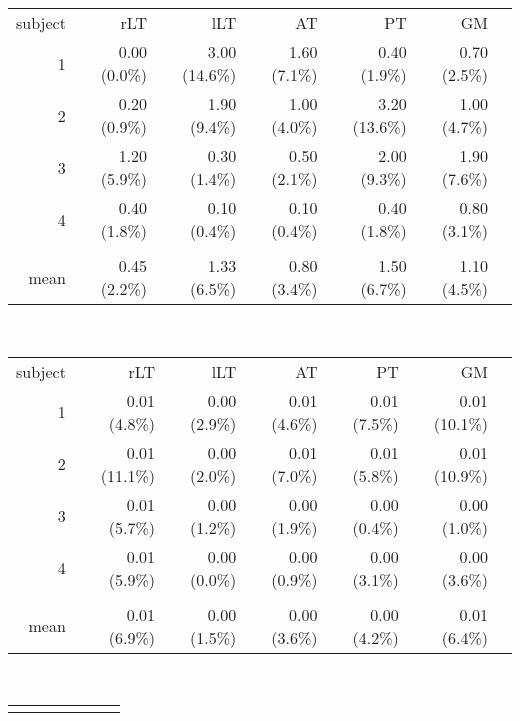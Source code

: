 \begin{table}[p]
\begin{tableframe}
\begin{adjustbox}{width={0.75\textwidth},keepaspectratio}
\begin{minipage}{\linewidth}
{\begin{minipage}{\linewidth}
\begin{tabular}{rrrrrrr}
	        \addlinespace
			\multicolumn{6}{c}{\textbf{FWHM$_{xy}$}}\\		
	        \toprule
            subject & rLT   & lLT   & AT    & PT    & GM    \\
            \midrule
            1     & 0.00 (0.0\%) & 3.00 (14.6\%) & 1.60 (7.1\%) & 0.40 (1.9\%) & 0.70 (2.5\%) \\
            2     & 0.20 (0.9\%) & 1.90 (9.4\%) & 1.00 (4.0\%) & 3.20 (13.6\%) & 1.00 (4.7\%) \\
            3     & 1.20 (5.9\%) & 0.30 (1.4\%) & 0.50 (2.1\%) & 2.00 (9.3\%) & 1.90 (7.6\%) \\
            4     & 0.40 (1.8\%) & 0.10 (0.4\%) & 0.10 (0.4\%) & 0.40 (1.8\%) & 0.80 (3.1\%)  \\
                  &       &       &       &       &       \\
            mean  & 0.45 (2.2\%) & 1.33 (6.5\%) & 0.80 (3.4\%) & 1.50 (6.7\%) & 1.10 (4.5\%) \\
            \bottomrule
            \end{tabular}%
			\\[0.5ex]
            \begin{tabular}{rrrrrrr}
            \addlinespace
			\multicolumn{6}{c}{\textbf{P0$_{z}$}}\\
			\toprule
            subject & rLT   & lLT   & AT    & PT    & GM   \\
            \midrule
            1     & 0.01 (4.8\%) & 0.00 (2.9\%) & 0.01 (4.6\%) & 0.01 (7.5\%) & 0.01 (10.1\%)\\
            2     & 0.01 (11.1\%) & 0.00 (2.0\%) & 0.01 (7.0\%) & 0.01 (5.8\%) & 0.01 (10.9\%) \\
            3     & 0.01 (5.7\%) & 0.00 (1.2\%) & 0.00 (1.9\%) & 0.00 (0.4\%) & 0.00 (1.0\%)  \\
            4     & 0.01 (5.9\%) & 0.00 (0.0\%) & 0.00 (0.9\%) & 0.00 (3.1\%) & 0.00 (3.6\%) \\
                  &       &       &       &       &       \\
            mean  & 0.01 (6.9\%) & 0.00 (1.5\%) & 0.00 (3.6\%) & 0.00 (4.2\%) & 0.01 (6.4\%)  \\
            \bottomrule
            \end{tabular}%
			\\[0.5ex]
            \begin{tabular}{rrrrrrr}
	        \addlinespace
			\multicolumn{6}{c}{\textbf{FWHM$_{z}$}}\\			

\end{tabular}
\end{minipage}}
\end{minipage}
\end{adjustbox}
\end{tableframe}
\end{table}
